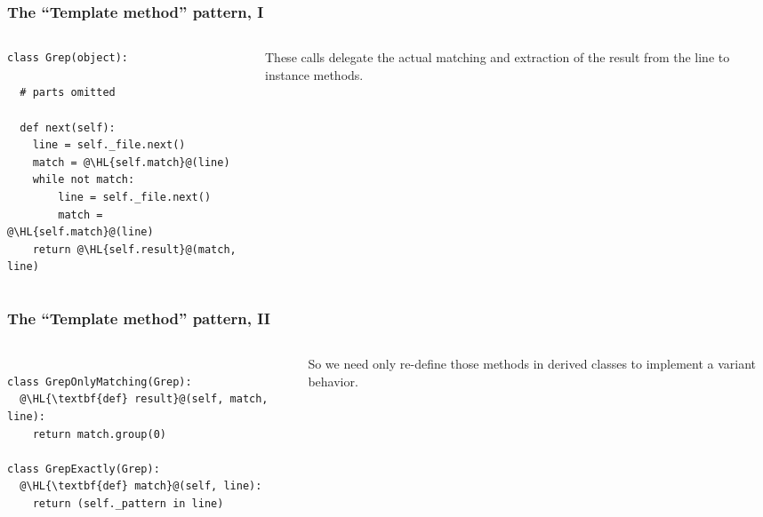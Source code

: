 \documentclass[english,serif,mathserif,xcolor=pdftex,dvipsnames,table]{beamer}
\begin{document}
\begin{frame}[fragile]
  \frametitle{The ``Template method'' pattern, I}
  \begin{columns}[t]
    \begin{column}{0.5\textwidth}
\begin{lstlisting}
class Grep(object):

  # parts omitted

  def next(self):
    line = self._file.next()
    match = @\HL{self.match}@(line)
    while not match:
        line = self._file.next()
        match = @\HL{self.match}@(line)
    return @\HL{self.result}@(match, line)
\end{lstlisting}
    \end{column}
    \begin{column}{0.5\textwidth}
      \raggedleft
      These calls delegate the actual matching and
      extraction of the result from the line to instance methods.
    \end{column}
  \end{columns}
\end{frame}


\begin{frame}[fragile]
  \frametitle{The ``Template method'' pattern, II}
  \begin{columns}[t]
    \begin{column}{0.5\textwidth}
\begin{lstlisting}

class GrepOnlyMatching(Grep):
  @\HL{\textbf{def} result}@(self, match, line):
    return match.group(0)

class GrepExactly(Grep):
  @\HL{\textbf{def} match}@(self, line):
    return (self._pattern in line)
\end{lstlisting}
    \end{column}
    \begin{column}{0.5\textwidth}
      \raggedleft
      So we need only re-define those methods in derived
      classes to implement a variant behavior.
    \end{column}
  \end{columns}
\end{frame}
\end{document}
